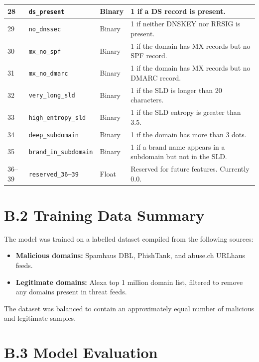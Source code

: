 \documentclass[12pt, a4paper, oneside]{report}
\begin{document}
\begin{longtable}{|p{0.8cm}|p{4.5cm}|p{2cm}|p{6.5cm}|}
\hline
28 & \texttt{ds\_present} & Binary & 1 if a DS record is present. \\
\hline
29 & \texttt{no\_dnssec} & Binary & 1 if neither DNSKEY nor RRSIG is present. \\
\hline
30 & \texttt{mx\_no\_spf} & Binary & 1 if the domain has MX records but no SPF record. \\
\hline
31 & \texttt{mx\_no\_dmarc} & Binary & 1 if the domain has MX records but no DMARC record. \\
\hline
32 & \texttt{very\_long\_sld} & Binary & 1 if the SLD is longer than 20 characters. \\
\hline
33 & \texttt{high\_entropy\_sld} & Binary & 1 if the SLD entropy is greater than 3.5. \\
\hline
34 & \texttt{deep\_subdomain} & Binary & 1 if the domain has more than 3 dots. \\
\hline
35 & \texttt{brand\_in\_subdomain} & Binary & 1 if a brand name appears in a subdomain but not in the SLD. \\
\hline
36--39 & \texttt{reserved\_36--39} & Float & Reserved for future features. Currently 0.0. \\
\hline
\end{longtable}

\section*{B.2 Training Data Summary}

The model was trained on a labelled dataset compiled from the following sources:
\begin{itemize}
    \item \textbf{Malicious domains:} Spamhaus DBL, PhishTank, and abuse.ch URLhaus feeds.
    \item \textbf{Legitimate domains:} Alexa top 1 million domain list, filtered to remove any domains present in threat feeds.
\end{itemize}
The dataset was balanced to contain an approximately equal number of malicious and legitimate samples.

\section*{B.3 Model Evaluation}
\end{document}
